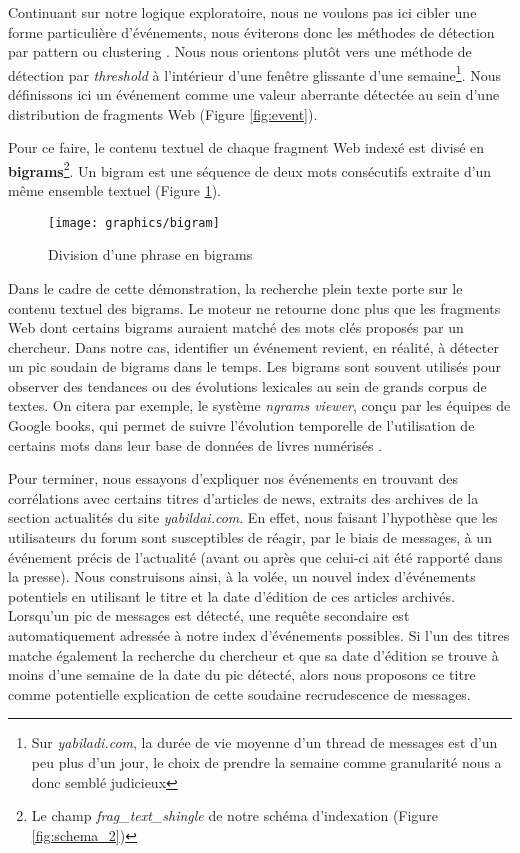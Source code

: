 \documentclass[symmetric,justified,marginals=raggedouter]{tufte-book}
\begin{document}
Continuant sur notre logique exploratoire, nous ne voulons pas ici cibler une forme particulière d'événements, nous éviterons donc les méthodes de détection par pattern \citep{chaney_detecting_2016} ou clustering  \citep{dodds_temporal_2011}. Nous nous orientons plutôt vers une méthode de détection par \textit{threshold} \citep{fung_parameter_2005} à l'intérieur d'une fenêtre glissante d'une semaine\footnote{Sur \textit{yabiladi.com}, la durée de vie moyenne d'un thread de messages est d'un peu plus d'un jour, le choix de prendre la semaine comme granularité nous a donc semblé judicieux}. Nous définissons ici un événement comme une valeur aberrante détectée au sein d'une distribution de fragments Web (Figure \ref{fig:event}).

Pour ce faire, le contenu textuel de chaque fragment Web indexé est divisé en \textbf{bigrams}\footnote{Le champ \textit{frag\_text\_shingle} de notre schéma d'indexation (Figure \ref{fig:schema_2})}. Un bigram est une séquence de deux mots consécutifs extraite d'un même ensemble textuel (Figure \ref{fig:bigram}). 

\begin{figure}%
  \texttt{[image: graphics/bigram]}
  \caption{Division d'une phrase en bigrams}
  \label{fig:bigram}
\end{figure} 

\noindent Dans le cadre de cette démonstration, la recherche plein texte porte sur le contenu textuel des bigrams. Le moteur ne retourne donc plus que les fragments Web dont certains bigrams auraient matché des mots clés proposés par un chercheur. Dans notre cas, identifier un événement revient, en réalité, à détecter un pic soudain de bigrams dans le temps. Les bigrams sont souvent utilisés pour observer des tendances ou des évolutions lexicales au sein de grands corpus de textes. On citera par exemple, le système \textit{ngrams viewer}, conçu par les équipes de Google books, qui permet de suivre l'évolution temporelle de l'utilisation de certains mots dans leur base de données de livres numérisés \citep{michel_quantitative_2011}.

Pour terminer, nous essayons d'expliquer nos événements en trouvant des corrélations avec certains titres d'articles de news, extraits des archives de la section actualités du site \textit{yabildai.com}. En effet, nous faisant l'hypothèse que les utilisateurs du forum sont susceptibles de réagir, par le biais de messages, à un événement précis de l'actualité (avant ou après que celui-ci ait été rapporté dans la presse). Nous construisons ainsi, à la volée, un nouvel index d'événements potentiels en utilisant le titre et la date d'édition de ces articles archivés. Lorsqu'un pic de messages est détecté, une requête secondaire est automatiquement adressée à notre index d'événements possibles. Si l'un des titres matche également la recherche du chercheur et que sa date d'édition se trouve à moins d'une semaine de la date du pic détecté, alors nous proposons ce titre comme potentielle explication de cette soudaine recrudescence de messages.
\end{document}
